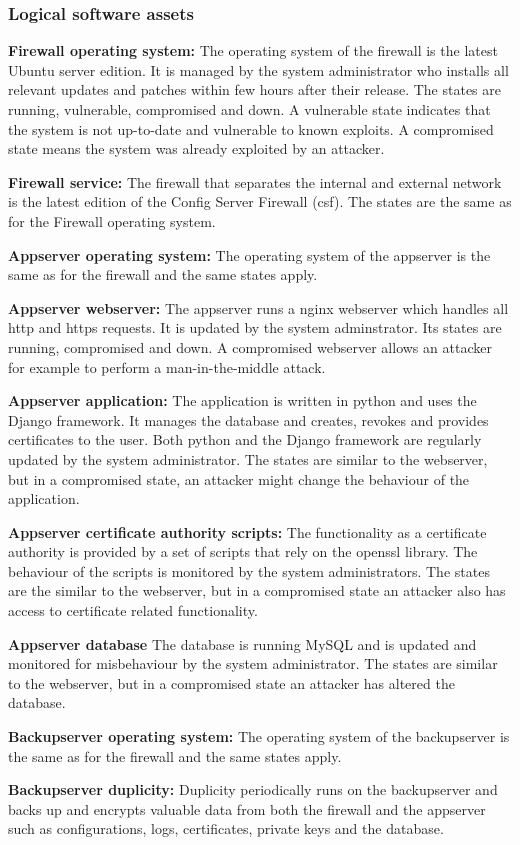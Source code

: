 \documentclass[english]{article}
\begin{document}
\subsubsection{Logical software assets}

	\begin{description}
		\item{\textbf{Firewall operating system:}} The operating system of the firewall is the latest Ubuntu server edition. It is managed by the system administrator who installs all relevant updates and patches within few hours after their release. The states are running, vulnerable, compromised and down. A vulnerable state indicates that the system is not up-to-date and vulnerable to known exploits. A compromised state means the system was already exploited by an attacker.
		\item{\textbf{Firewall service:}} The firewall that separates the internal and external network is the latest edition of the Config Server Firewall (csf). The states are the same as for the Firewall operating system.
		\item{\textbf{Appserver operating system:}} The operating system of the appserver is the same as for the firewall and the same states apply.
		\item{\textbf{Appserver webserver:}} The appserver runs a nginx webserver which handles all http and https requests. It is updated by the system adminstrator. Its states are running, compromised and down. A compromised webserver allows an attacker for example to perform a man-in-the-middle attack.
		\item{\textbf{Appserver application:}} The application is written in python and uses the Django framework. It manages the database and creates, revokes and provides certificates to the user. Both python and the Django framework are regularly updated by the system administrator. The states are similar to the webserver, but in a compromised state, an attacker might change the behaviour of the application.
		\item{\textbf{Appserver certificate authority scripts:}} The functionality as a certificate authority is provided by a set of scripts that rely on the openssl library. The behaviour of the scripts is monitored by the system administrators. The states are the similar to the webserver, but in a compromised state an attacker also has access to certificate related functionality.
		\item{\textbf{Appserver database}} The database is running MySQL and is updated and monitored for misbehaviour by the system administrator. The states are similar to the webserver, but in a compromised state an attacker has altered the database.
		\item{\textbf{Backupserver operating system:}} The operating system of the backupserver is the same as for the firewall and the same states apply.
		\item{\textbf{Backupserver duplicity:}} Duplicity periodically runs on the backupserver and backs up and encrypts valuable data from both the firewall and the appserver such as configurations, logs, certificates, private keys and the database.
	\end{description}
\end{document}

